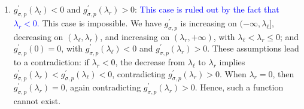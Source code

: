 \documentclass[a4paper, 10pt]{article}
\theoremstyle{definition}
\begin{document}
\begin{itemize}
\begin{itemize}
\begin{enumerate}
                 
             \item  $g^{'}_{\sigma,p}(\lambda_l)<0$ and $g^{'}_{\sigma,p}(\lambda_r)>0$: \textcolor{blue}{This case is ruled out by the fact that $\lambda_r<0$.} This case is impossible. We have $g^{'}_{\sigma,p}$ is increasing on \( (-\infty, \lambda_\ell] \), decreasing on \( (\lambda_\ell, \lambda_r) \), and increasing on \( (\lambda_r, +\infty) \), with \( \lambda_\ell < \lambda_r \leq 0 \); and \( g^{'}_{\sigma,p}(0) = 0 \), with \( g^{'}_{\sigma,p}(\lambda_\ell) < 0 \) and \( g^{'}_{\sigma,p}(\lambda_r) > 0 \). These assumptions lead to a contradiction: if \( \lambda_r < 0 \), the decrease from \( \lambda_\ell \) to \( \lambda_r \) implies \( g^{'}_{\sigma,p}(\lambda_r) < g^{'}_{\sigma,p}(\lambda_\ell) < 0 \), contradicting \( g^{'}_{\sigma,p}(\lambda_r) > 0 \). When \( \lambda_r = 0 \), then \( g^{'}_{\sigma,p}(\lambda_r) = 0 \), again contradicting \( g^{'}_{\sigma,p}(\lambda_r) > 0 \). Hence, such a function cannot exist.
             

\end{enumerate}
\end{itemize}
\end{itemize}
\end{document}
